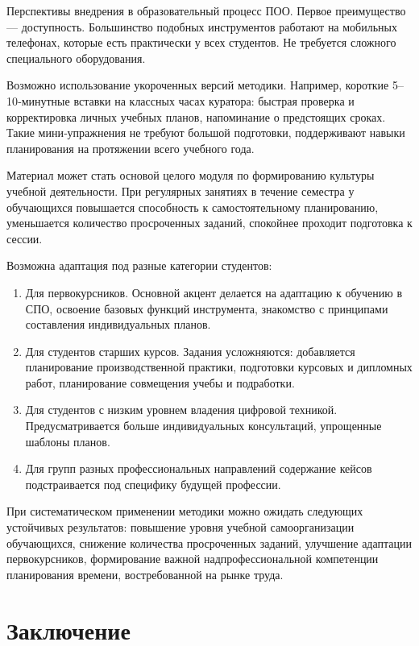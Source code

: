 \documentclass[14pt,a4paper]{article}
\begin{document}
Перспективы внедрения в образовательный процесс ПОО. Первое преимущество — доступность. Большинство подобных инструментов работают на мобильных телефонах, которые есть практически у всех студентов. Не требуется сложного специального оборудования.

Возможно использование укороченных версий методики. Например, короткие 5–10‑минутные вставки на классных часах куратора: быстрая проверка и корректировка личных учебных планов, напоминание о предстоящих сроках. Такие мини‑упражнения не требуют большой подготовки, поддерживают навыки планирования на протяжении всего учебного года.

Материал может стать основой целого модуля по формированию культуры учебной деятельности. При регулярных занятиях в течение семестра у обучающихся повышается способность к самостоятельному планированию, уменьшается количество просроченных заданий, спокойнее проходит подготовка к сессии.

Возможна адаптация под разные категории студентов:
\begin{enumerate}
    \item Для первокурсников. Основной акцент делается на адаптацию к обучению в СПО, освоение базовых функций инструмента, знакомство с принципами составления индивидуальных планов.
    \item Для студентов старших курсов. Задания усложняются: добавляется планирование производственной практики, подготовки курсовых и дипломных работ, планирование совмещения учебы и подработки.
    \item Для студентов с низким уровнем владения цифровой техникой. Предусматривается больше индивидуальных консультаций, упрощенные шаблоны планов.
    \item Для групп разных профессиональных направлений содержание кейсов подстраивается под специфику будущей профессии.
\end{enumerate}

При систематическом применении методики можно ожидать следующих устойчивых результатов: повышение уровня учебной самоорганизации обучающихся, снижение количества просроченных заданий, улучшение адаптации первокурсников, формирование важной надпрофессиональной компетенции планирования времени, востребованной на рынке труда.


\newpage
\section*{Заключение}
\end{document}
